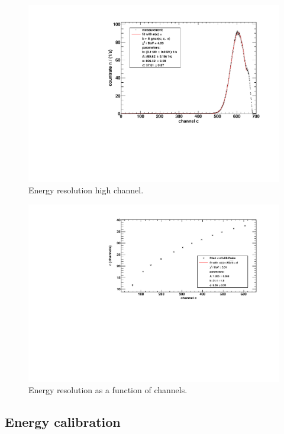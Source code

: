 \begin{figure}[H]
\begin{center}
  \includegraphics[width=\textwidth]{../img/energieaufloesung_604.pdf}
  \caption{Energy resolution high channel.}
  \label{img:eres:604}
\end{center}
\end{figure}

\begin{figure}[H]
\begin{center}
  \includegraphics[width=\textwidth]{../img/energieaufloesung_channels.pdf}
  \caption{Energy resolution as a function of channels.}
  \label{img:eres:channels}
\end{center}
\end{figure}

\subsection{Energy calibration}
